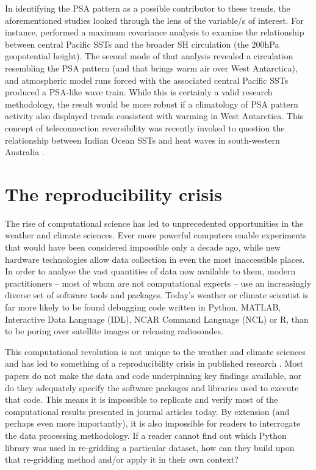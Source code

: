In identifying the PSA pattern as a possible contributor to these trends, the aforementioned studies looked through the lens of the variable/s of interest. For instance, \citet{Ding2011} performed a maximum covariance analysis to examine the relationship between central Pacific SSTs and the broader SH circulation (the 200hPa geopotential height). The second mode of that analysis revealed a circulation resembling the PSA pattern (and that brings warm air over West Antarctica), and atmospheric model runs forced with the associated central Pacific SSTs produced a PSA-like wave train. While this is certainly a valid research methodology, the result would be more robust if a climatology of PSA pattern activity also displayed trends consistent with warming in West Antarctica. This concept of teleconnection reversibility was recently invoked to question the relationship between Indian Ocean SSTs and heat waves in south-western Australia \citep{Boschat2016}.   

 

\section{The reproducibility crisis}\label{s:reproducibility_overview}

The rise of computational science has led to unprecedented opportunities in the weather and climate sciences. Ever more powerful computers enable experiments that would have been considered impossible only a decade ago, while new hardware technologies allow data collection in even the most inaccessible places. In order to analyse the vast quantities of data now available to them, modern practitioners -- most of whom are not computational experts -- use an increasingly diverse set of software tools and packages. Today's weather or climate scientist is far more likely to be found debugging code written in Python, MATLAB, Interactive Data Language (IDL), NCAR Command Language (NCL) or R, than to be poring over satellite images or releasing radiosondes. 

This computational revolution is not unique to the weather and climate sciences and has led to something of a reproducibility crisis in published research \citep[e.g.][]{Peng2011}. Most papers do not make the data and code underpinning key findings available, nor do they adequately specify the software packages and libraries used to execute that code. This means it is impossible to replicate and verify most of the computational results presented in journal articles today. By extension (and perhaps even more importantly), it is also impossible for readers to interrogate the data processing methodology. If a reader cannot find out which Python library was used in re-gridding a particular dataset, how can they build upon that re-gridding method and/or apply it in their own context? 

